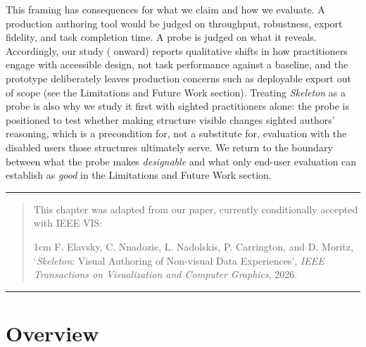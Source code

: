\documentclass[12pt]{cmuthesis}
\begin{document}
This framing has consequences for what we claim and how we evaluate. A production authoring tool would be judged on throughput, robustness, export fidelity, and task completion time. A probe is judged on what it reveals. Accordingly, our study ( onward) reports qualitative shifts in how practitioners engage with accessible design, not task performance against a baseline, and the prototype deliberately leaves production concerns such as deployable export out of scope (see the Limitations and Future Work section). Treating \textit{Skeleton} as a probe is also why we study it first with sighted practitioners alone: the probe is positioned to test whether making structure visible changes sighted authors' reasoning, which is a precondition for, not a substitute for, evaluation with the disabled users those structures ultimately serve. We return to the boundary between what the probe makes \textit{designable} and what only end-user evaluation can establish as \textit{good} in the Limitations and Future Work section.

\newpage

\noindent\rule{16cm}{0.4pt}
\begin{quote}
This chapter was adapted from our paper, currently conditionally accepted with IEEE VIS:
\begin{adjustwidth}{1cm}{}
F. Elavsky, C. Nnadozie, L. Nadolskis, P. Carrington, and D. Moritz, ‘\textit{Skeleton}: Visual Authoring of Non-visual Data Experiences’, \textit{IEEE Transactions on Visualization and Computer Graphics}, 2026.
\end{adjustwidth}
\end{quote}
\noindent\rule{16cm}{0.4pt}


\section{Overview}
\end{document}
